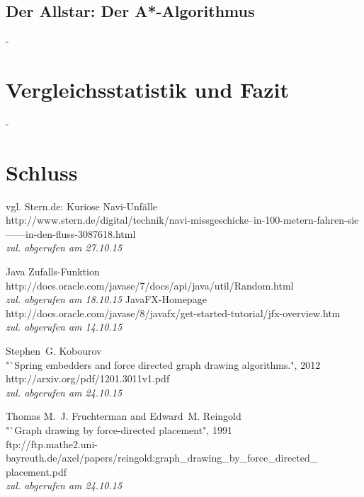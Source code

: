 \documentclass[12pt]{article}
\begin{document}
\subsection{Der Allstar: Der A*-Algorithmus}
\newpage
-
\newpage

\section{Vergleichsstatistik und Fazit}
\newpage
-
\newpage

\section{Schluss}
\newpage

%
%
\begin{thebibliography}{9}
 vgl. Stern.de: Kuriose Navi-Unfälle\\
\newblock http://www.stern.de/digital/technik/navi-missgeschicke--in-100-metern-fahren-sie------in-den-fluss-3087618.html \\\emph{zul. abgerufen am 27.10.15}

 Java Zufalls-Funktion\\
\newblock http://docs.oracle.com/javase/7/docs/api/java/util/Random.html \\\emph{zul. abgerufen am 18.10.15}
 JavaFX-Homepage\\
\newblock http://docs.oracle.com/javase/8/javafx/get-started-tutorial/jfx-overview.htm \\\emph{zul. abgerufen am 14.10.15}

 Stephen~G. Kobourov\\
\newblock "`Spring embedders and force directed graph drawing algorithms.", 2012\\
\newblock http://arxiv.org/pdf/1201.3011v1.pdf \\\emph{zul. abgerufen am 24.10.15}

 Thomas M.~J. Fruchterman and Edward~M. Reingold\\
\newblock "`Graph drawing by force-directed placement", 1991\\
\newblock ftp://ftp.mathe2.uni-bayreuth.de/axel/papers/reingold:graph{\_}drawing{\_}by{\_}force{\_}directed{\_}\\placement.pdf \\\emph{zul. abgerufen am 24.10.15}

\end{thebibliography}
\newpage


\end{document}
